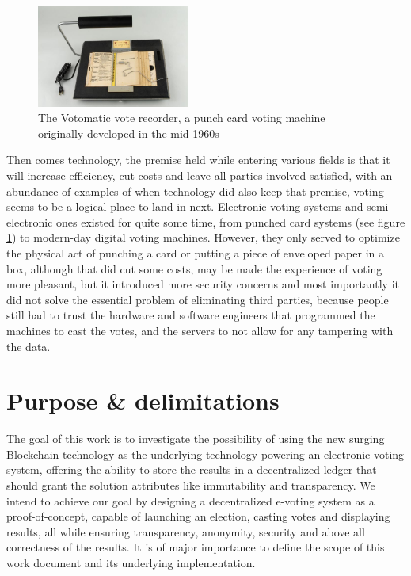 \begin{figure}
	\vspace{-10pt}
	\includegraphics[width=5cm]{images/chapter1/votomatic.jpg}
	\vspace{-10pt}
	\caption{{\footnotesize The Votomatic vote recorder, a punch card voting machine originally developed in the mid 1960s}}
	\label{votomatic}
\end{figure}

Then comes technology, the premise held while entering various fields is that it will increase efficiency, cut costs and leave all parties involved satisfied, with an abundance of examples of when technology did also keep that premise, voting seems to be a logical place to land in next. Electronic voting systems and semi-electronic ones existed for quite some time, from punched card systems {\small (see figure \ref{votomatic})} to modern-day digital voting machines. However, they only served to optimize the physical act of punching a card or putting a piece of enveloped paper in a box, although that did cut some costs, may be made the experience of voting more pleasant, but it introduced more security concerns and most importantly it did not solve the essential problem of eliminating third parties, because people still had to trust the hardware and software engineers that programmed the machines to cast the votes, and the servers to not allow for any tampering with the data.\newpage


\section{Purpose \& delimitations}
The goal of this work is to investigate the possibility of using the new surging Blockchain technology as the underlying technology powering an electronic voting system, offering the ability to store the results in a decentralized ledger that should grant the solution attributes like immutability and transparency. We intend to achieve our goal by designing a decentralized e-voting system as a \gls{proof-of-concept}, capable of launching an election, casting votes and displaying results, all while ensuring transparency, anonymity, security and above all correctness of the results.
It is of major importance to define the scope of this work document and its underlying implementation.

